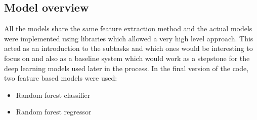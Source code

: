 \subsection{Model overview}
All the models share the same feature extraction method and the actual models were implemented using libraries which allowed a very high level approach. This acted as an introduction to the subtasks and which ones would be interesting to focus on and also as a baseline system which would work as a stepstone for the deep learning models used later in the process. In the final version of the code, two feature based models were used:\\
\begin{itemize}
 \item Random forest classifier
 \item Random forest regressor
\end{itemize}
